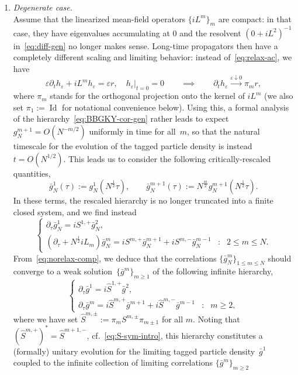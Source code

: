 \documentclass[a4paper,11pt,reqno,noindent]{amsart}
\theoremstyle{plain}
\numberwithin{equation}{section}
\newcommand{\e}{\varepsilon}
\newcommand{\Id}{\operatorname{Id}}
\newcommand{\3}{|\!|\!|}
\begin{document}
\begin{enumerate}[---]
\medskip\item \emph{Degenerate case.}\\
Assume that the linearized mean-field operators $\{iL^m\}_m$ are compact: in that case, they have eigenvalues accumulating at $0$ and the resolvent $(0+iL^2)^{-1}$ in~\eqref{eq:diff-gen} no longer makes sense. Long-time propagators then have a completely different scaling and limiting behavior: instead of~\eqref{eq:relax-ac}, we have
\begin{equation}\label{eq:norelax-comp}
\e\partial_th_\e+iL^mh_\e=\e r,\quad h_\e|_{t=0}=0\qquad\implies\qquad \partial_th_\e\xrightarrow{\e\downarrow0}\pi_mr,
\end{equation}
where $\pi_m$ stands for the orthogonal projection onto the kernel of $iL^m$ (we also set \mbox{$\pi_1:=\Id$} for notational convenience below).
Using this, a formal analysis of the hierarchy~\eqref{eq:BBGKY-cor-gen} rather leads to expect $g_N^{m+1}=O(N^{-m/2})$ uniformly in time for all~$m$, so that the natural timescale for the evolution of the tagged particle density is instead~$t=O( N^{1/2})$. This leads us to consider the following critically-rescaled quantities,
\[\bar g_N^1(\tau):=g_N^1(N^\frac12\tau),\qquad\bar g_N^{m+1}(\tau):=N^{\frac m2}g_N^{m+1}(N^\frac12\tau).\]
In these terms, the rescaled hierarchy is no longer truncated into a finite closed system, and we find instead
\[\left\{\begin{array}{lll}
\partial_\tau\bar g_N^1=iS^{1,+}\bar g_N^{2},\\
(\partial_\tau+N^\frac12iL_m)\bar g_N^m=iS^{m,+}\bar g_N^{m+1}+iS^{m,-}\bar g_N^{m-1}&:&2\le m\le N.
\end{array}\right.\]
From~\eqref{eq:norelax-comp}, we deduce that the correlations $\{\bar g_N^m\}_{1\le m\le N}$ should converge to a weak solution~$\{\bar g^m\}_{m\ge1}$ of the following infinite hierarchy,
\begin{equation}\label{eq:compact-lim-hier}
\left\{\begin{array}{lll}
\partial_\tau\bar g^1=i\hat S^{1,+}\bar g^{2},\\
\partial_\tau\bar g^m=i\hat S^{m,+}\bar g^{m+1}+i\hat S^{m,-}\bar g^{m-1}&:&m\ge2,
\end{array}\right.
\end{equation}
where we have set $\hat S^{m,\pm}:=\pi_mS^{m,\pm}\pi_{m\pm1}$ for all $m$. Noting that $(\hat S^{m,+})^*=\hat S^{m+1,-}$, cf.~\eqref{eq:S-sym-intro}, this hierarchy constitutes a (formally) unitary evolution for the limiting tagged particle density~$\bar g^1$ coupled to the infinite collection of limiting correlations $\{\bar g^m\}_{m\ge2}$

\end{enumerate}
\end{document}
